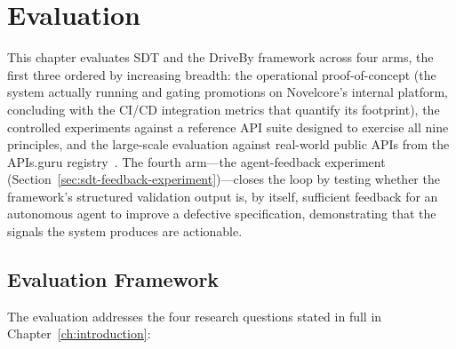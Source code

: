 \chapter{Evaluation}
\label{ch:evaluation}

This chapter evaluates SDT and the DriveBy framework across four arms, the first three ordered by increasing breadth: the operational proof-of-concept (the system actually running and gating promotions on Novelcore's internal platform, concluding with the CI/CD integration metrics that quantify its footprint), the controlled experiments against a reference API suite designed to exercise all nine principles, and the large-scale evaluation against real-world public APIs from the APIs.guru registry~\cite{apis-guru}. The fourth arm---the agent-feedback experiment (Section~\ref{sec:sdt-feedback-experiment})---closes the loop by testing whether the framework's structured validation output is, by itself, sufficient feedback for an autonomous agent to improve a defective specification, demonstrating that the signals the system produces are actionable.

\section{Evaluation Framework}
\label{sec:eval-framework}

The evaluation addresses the four research questions stated in full in Chapter~\ref{ch:introduction}:


